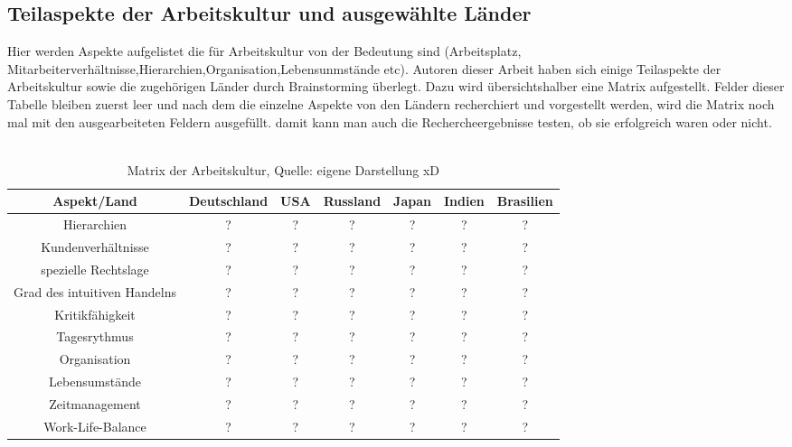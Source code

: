 \subsection{Teilaspekte der Arbeitskultur und ausgewählte Länder}
Hier werden Aspekte aufgelistet die für Arbeitskultur von der Bedeutung sind (Arbeitsplatz, Mitarbeiterverhältnisse,Hierarchien,Organisation,Lebensunmstände etc).
Autoren dieser Arbeit haben sich einige Teilaspekte der Arbeitskultur sowie die zugehörigen Länder durch Brainstorming überlegt. Dazu wird übersichtshalber eine Matrix aufgestellt. Felder dieser Tabelle bleiben zuerst leer und nach dem die einzelne Aspekte von den Ländern recherchiert und vorgestellt werden, wird die Matrix noch mal mit den ausgearbeiteten Feldern ausgefüllt. damit kann man auch die Rechercheergebnisse testen, ob sie erfolgreich waren oder nicht. \\
\\
\begin{table}[htp]
\begin{tabular}{|c|c|c|c|c|c|c|}
\hline  Aspekt/Land& Deutschland & USA & Russland & Japan & Indien & Brasilien \\ 
\hline Hierarchien  & ? & ? & ? & ? & ? & ? \\ 
\hline  Kundenverhältnisse& ? & ? & ? & ? & ? & ? \\ 
\hline  spezielle Rechtslage& ? & ? & ? & ? & ? & ? \\ 
\hline  Grad des intuitiven Handelns& ? & ? & ? & ? & ? & ? \\ 
\hline  Kritikfähigkeit& ? & ? & ? & ? & ? & ? \\ 
\hline  Tagesrythmus& ? & ? & ? & ? & ? & ? \\ 
\hline  Organisation& ? & ? & ? & ? & ? & ? \\ 
\hline  Lebensumstände& ? & ? & ? & ? & ? & ? \\ 
\hline  Zeitmanagement& ? & ? & ? & ? & ? & ? \\ 
\hline  Work-Life-Balance& ? & ? & ? & ? & ? & ? \\ 
\hline 
\end{tabular} 
\caption{Matrix der Arbeitskultur, Quelle: eigene Darstellung xD}
\end{table}


